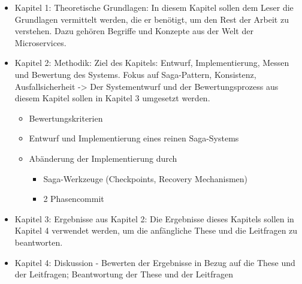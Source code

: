 \begin{itemize}
	\item Kapitel 1: Theoretische Grundlagen: In diesem Kapitel sollen dem Leser die Grundlagen vermittelt werden, die er benötigt, um den Rest der Arbeit zu verstehen. Dazu gehören Begriffe und Konzepte aus der Welt der Microservices. 
	\item Kapitel 2: Methodik: Ziel des Kapitels: Entwurf, Implementierung, Messen und Bewertung des Systems. Fokus auf Saga-Pattern, Konsistenz, Ausfallsicherheit -> Der Systementwurf und der Bewertungsprozess aus diesem Kapitel sollen in Kapitel 3 umgesetzt werden.
	\begin{itemize}
		\item Bewertungskriterien
		\item Entwurf und Implementierung eines reinen Saga-Systems
		\item Abänderung der Implementierung durch 
		\begin{itemize}
			\item Saga-Werkzeuge (Checkpoints, Recovery Mechanismen)
			\item 2 Phasencommit
		\end{itemize}
	\end{itemize}
	\item Kapitel 3: Ergebnisse aus Kapitel 2: Die Ergebnisse dieses Kapitels sollen in Kapitel 4 verwendet werden, um die anfängliche These und die Leitfragen zu beantworten.
	\item Kapitel 4: Diskussion - Bewerten der Ergebnisse in Bezug auf die These und der Leitfragen; Beantwortung der These und der Leitfragen
	
\end{itemize}













